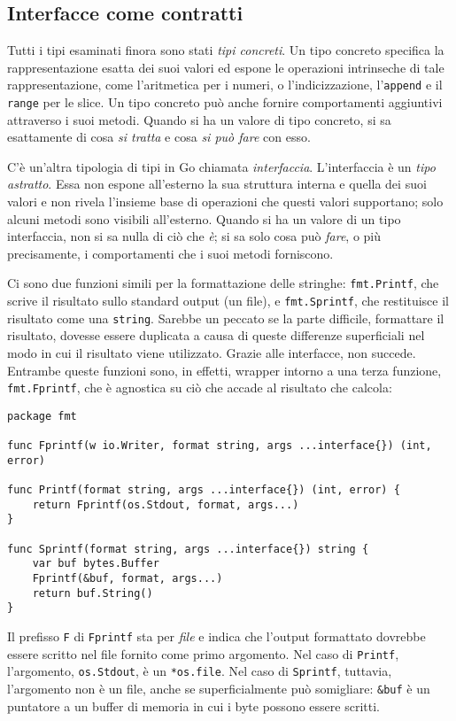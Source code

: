 \documentclass[../../thesis.tex]{subfiles}
\begin{document}
    \subsection{Interfacce come contratti}\label{subsec:interfacce-come-contratti}
    Tutti i tipi esaminati finora sono stati \textit{tipi concreti}.
    Un tipo concreto specifica la rappresentazione esatta dei suoi valori ed espone le operazioni intrinseche di tale rappresentazione, come l'aritmetica per i numeri, o l'indicizzazione, l'\verb"append" e il \verb"range" per le slice.
    Un tipo concreto può anche fornire comportamenti aggiuntivi attraverso i suoi metodi.
    Quando si ha un valore di tipo concreto, si sa esattamente di cosa \textit{si tratta} e cosa \textit{si può fare} con esso.
    \hfill \vspace{12pt}

    C'è un'altra tipologia di tipi in Go chiamata \textit{interfaccia}.
    L'interfaccia è un \textit{tipo astratto}.
    Essa non espone all'esterno la sua struttura interna e quella dei suoi valori e non rivela l'insieme base di operazioni che questi valori supportano;
    solo alcuni metodi sono visibili all'esterno.
    Quando si ha un valore di un tipo interfaccia, non si sa nulla di ciò che \textit{è}; si sa solo cosa può \textit{fare}, o più precisamente, i comportamenti che i suoi metodi forniscono.
    \hfill \vspace{12pt}

    Ci sono due funzioni simili per la formattazione delle stringhe: \verb"fmt.Printf", che scrive il risultato sullo standard output (un file), e \verb"fmt.Sprintf", che restituisce il risultato come una \verb"string".
    Sarebbe un peccato se la parte difficile, formattare il risultato, dovesse essere duplicata a causa di queste differenze superficiali nel modo in cui il risultato viene utilizzato.
    Grazie alle interfacce, non succede.
    Entrambe queste funzioni sono, in effetti, wrapper intorno a una terza funzione, \verb"fmt.Fprintf", che è agnostica su ciò che accade al risultato che calcola:
    \begin{lstlisting}[frame = single,label={lst:lstlisting6-1.1}]
package fmt

func Fprintf(w io.Writer, format string, args ...interface{}) (int, error)

func Printf(format string, args ...interface{}) (int, error) {
    return Fprintf(os.Stdout, format, args...)
}

func Sprintf(format string, args ...interface{}) string {
    var buf bytes.Buffer
    Fprintf(&buf, format, args...)
    return buf.String()
}
    \end{lstlisting}
    Il prefisso \verb"F" di \verb"Fprintf" sta per \textit{file} e indica che l'output formattato dovrebbe essere scritto nel file fornito come primo argomento.
    Nel caso di \verb"Printf", l'argomento, \verb"os.Stdout", è un \verb"*os.file".
    Nel caso di \verb"Sprintf", tuttavia, l'argomento non è un file, anche se superficialmente può somigliare: \verb"&buf" è un puntatore a un buffer di memoria in cui i byte possono essere scritti.
    \hfill \vspace{12pt}
\end{document}
